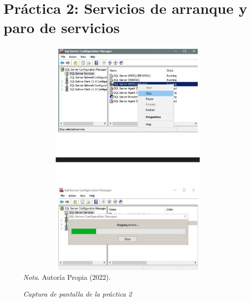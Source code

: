 \documentclass[stu, 12pt, letterpaper, donotrepeattitle, floatsintext, natbib]{apa7}
\begin{document}
\section{Práctica 2: Servicios de arranque y paro de servicios}
\begin{figure}[H]
    \caption{\emph{Captura de pantalla de la práctica 2\\}}
    \centering
    \smallskip
    \includegraphics[width=17cm, height=12cm]{act3.jpg}
    \bigskip
    \justifying\small\textit{Nota}. %
    Autoría Propia (2022).
\end{figure}
\vspace{\baselineskip}
\end{document}
